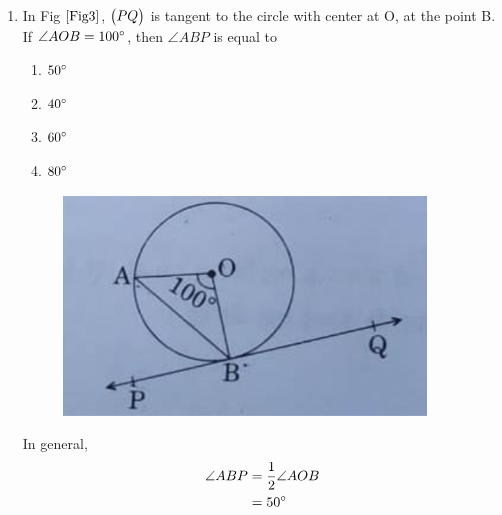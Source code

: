 \documentclass[journal,12pt,twocolumn]{IEEEtran}
\begin{document}
\begin{enumerate}
\item In Fig $\ref{Fig3}$, $\begin{pmatrix}PQ\end{pmatrix}$ is tangent to the circle with center at O, at the point B. If $\angle{AOB} = 100\degree$, then $\angle{ABP}$ is equal to
\begin{enumerate}
\item $50\degree$
\item $40\degree$
\item $60\degree$
\item $80\degree$
\end{enumerate}

\begin{figure}[h!]
    \centering
    \includegraphics[width=0.5\columnwidth]{Fig3.png}
	\caption{}
	\label{Fig3}
 \end{figure}
 \solution  In general,
	\begin{align}
		\angle{ABP} &= \frac{1}{2} \angle{AOB} 
		\\
		&= 50 \degree
	\end{align}


\end{enumerate}
\end{document}
